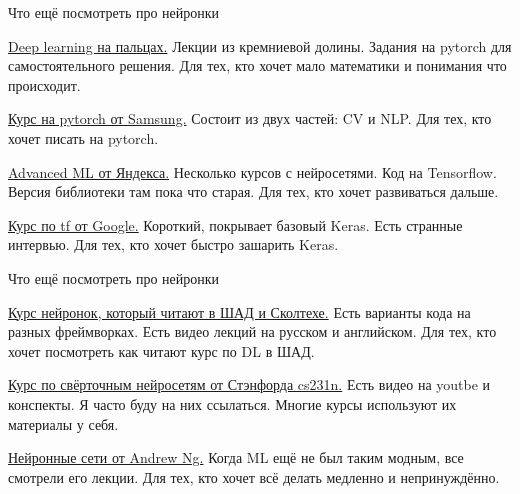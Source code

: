 \documentclass[notes,12pt, aspectratio=169]{beamer}
\newenvironment{wideitemize}{\itemize\addtolength{\itemsep}{10pt}}{\enditemize}
\begin{document}
\begin{frame}{Что ещё посмотреть  про нейронки}
\begin{wideitemize} 
\item  \href{https://dlcourse.ai}{Deep learning на пальцах.} Лекции из кремниевой долины. Задания на pytorch для самостоятельного решения.   \alert{Для тех, кто  хочет мало математики и понимания что происходит.}

\item \href{https://stepik.org/course/50352/syllabus}{Курс на pytorch от Samsung.}  Состоит из двух частей: CV и NLP. \alert{Для тех, кто  хочет писать на pytorch.}

\item  \href{https://www.coursera.org/specializations/aml}{Advanced ML от Яндекса.} Несколько курсов с нейросетями. Код на Tensorflow. Версия библиотеки там пока что старая.  \alert{Для тех, кто хочет развиваться дальше.}

\item  \href{https://www.udacity.com/course/intro-to-tensorflow-for-deep-learning--ud187}{Курс по tf от Google.} Короткий, покрывает базовый Keras. Есть странные интервью.  \alert{Для тех, кто  хочет быстро зашарить Keras.}
\end{wideitemize} 
\end{frame} 


\begin{frame}{Что ещё посмотреть  про нейронки}
\begin{wideitemize} 		
	\item  \href{https://github.com/yandexdataschool/Practical_DL/tree/master}{Курс нейронок, который читают в ШАД и Сколтехе.} Есть варианты кода на разных фреймворках. Есть видео лекций на русском и английском. \alert{Для тех, кто хочет посмотреть как читают курс по DL  в ШАД.}
	
	\item  \href{https://github.com/yandexdataschool/Practical_DL/tree/master}{Курс по свёрточным нейросетям от Стэнфорда cs231n.}  Есть видео на youtbe и конспекты. Я часто буду на них ссылаться.  Многие курсы используют их материалы у себя. 
	
	\item  \href{https://www.coursera.org/specializations/deep-learning} {Нейронные сети от Andrew Ng.} Когда ML ещё не был таким модным, все смотрели его лекции. \alert{Для тех, кто хочет всё делать медленно и непринуждённо.}
\end{wideitemize} 
\end{frame} 
\end{document}
